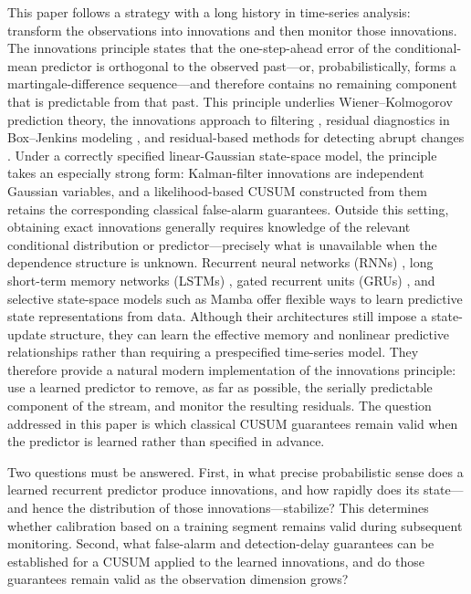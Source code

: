 \documentclass[bj,authoryear]{imsart}
\theoremstyle{plain}
\theoremstyle{definition}
\begin{document}
This paper follows a strategy with a long history in time-series analysis: transform the observations into innovations and then monitor those innovations. The innovations principle states that the one-step-ahead error of the conditional-mean predictor is orthogonal to the observed past—or, probabilistically, forms a martingale-difference sequence—and therefore contains no remaining component that is predictable from that past. This principle underlies Wiener--Kolmogorov prediction theory, the innovations approach to filtering \citep{kailath1968innovations}, residual diagnostics in Box--Jenkins modeling \citep{box2015time}, and residual-based methods for detecting abrupt changes \citep{basseville1993detection}.
%
Under a correctly specified linear-Gaussian state-space model, the principle takes an especially strong form: Kalman-filter innovations are independent Gaussian variables, and a likelihood-based CUSUM constructed from them retains the corresponding classical false-alarm guarantees. Outside this setting, obtaining exact innovations generally requires knowledge of the relevant conditional distribution or predictor—precisely what is unavailable when the dependence structure is unknown.
%
Recurrent neural networks (RNNs) \citep{rumelhart1986learning}, long short-term memory networks (LSTMs) \citep{hochreiter1997long}, gated recurrent units (GRUs) \citep{cho2014learning}, and selective state-space models such as Mamba \citep{gu2023mamba} offer flexible ways to learn predictive state representations from data. Although their architectures still impose a state-update structure, they can learn the effective memory and nonlinear predictive relationships rather than requiring a prespecified time-series model. They therefore provide a natural modern implementation of the innovations principle: use a learned predictor to remove, as far as possible, the serially predictable component of the stream, and monitor the resulting residuals. The question addressed in this paper is which classical CUSUM guarantees remain valid when the predictor is learned rather than specified in advance.

Two questions must be answered. First, in what precise probabilistic sense does a learned recurrent predictor produce innovations, and how rapidly does its state—and hence the distribution of those innovations—stabilize? This determines whether calibration based on a training segment remains valid during subsequent monitoring. Second, what false-alarm and detection-delay guarantees can be established for a CUSUM applied to the learned innovations, and do those guarantees remain valid as the observation dimension grows?
\end{document}
